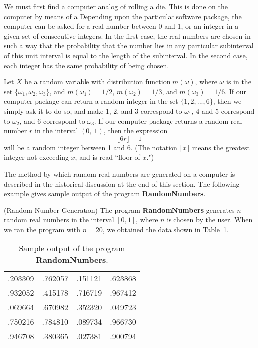 We must first find a computer analog of rolling a die.  This is done on
the computer by means of a 
Depending upon the particular software
package, the computer can be asked for a real number between 0 and 1, or an integer in a given
set of consecutive integers.  In the first case, the real numbers are chosen in such a way that
the probability that the number lies in any particular subinterval of this unit interval is
equal to the length of the subinterval.  In the second case, each integer has the same
probability of being chosen.
\par
Let $X$ be a random variable with distribution function $m(\omega)$, where $\omega$ is in the set $\{\omega_1,
\omega_2, \omega_3\}$, and $m(\omega_1) = 1/2$, $m(\omega_2) = 1/3$, and $m(\omega_3) = 1/6$.  If our
computer package can return a random integer in the set $\{1, 2, ..., 6\}$, then we simply ask it to
do so, and make 1, 2, and 3 correspond to $\omega_1$, 4 and 5 correspond to $\omega_2$, and 6
correspond to $\omega_3$.  If our computer package returns a random real number $r$ in the interval
$(0,~1)$, then the expression
$$\lfloor {6r}\rfloor + 1$$
will be a random integer between 1 and 6.  (The notation $\lfloor x \rfloor$ means the greatest integer
not exceeding $x$, and is read ``floor of $x$.")
\par
The method by which random real numbers are generated on a computer is described in the historical
discussion at the end of this section.  The following example gives sample output of the program {\bf
RandomNumbers}.
\begin{example}(Random Number Generation) \label{exam 1.05}
The program {\bf RandomNumbers} generates $n$ random real numbers in the interval $[0, 1]$, where
$n$ is chosen by the user.  When we ran the program with $n = 20$, we obtained the data shown in
Table~\ref{table 1.1}.
\begin{table}
\centering
\begin{tabular}{llll} 
.203309 &
.762057 &
.151121 &
.623868 \\
.932052 &
.415178 &
.716719 &
.967412 \\
.069664 & 
.670982 &
.352320 &
.049723 \\
.750216 &
.784810 &
.089734 &
.966730 \\
.946708 &
.380365 &
.027381 &
.900794 \\
\end{tabular}
\caption{Sample output of the program {\bf RandomNumbers}.}
\label{table 1.1}
\end{table}
\end{example}

